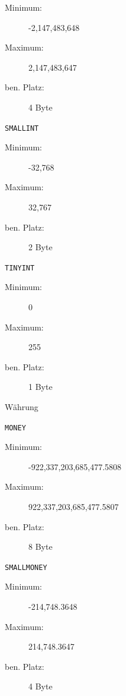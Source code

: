 \documentclass[12pt,ngerman,a4paper,index=totoc,twoside]{scrartcl}
\newcommand{\sql}[1]{\texttt{#1}}
\begin{document}
\begin{compactitem}
\begin{compactitem}
   \begin{description}
  	\item[Minimum:] -2,147,483,648
  	\item[Maximum:] 2,147,483,647
  	\item[ben. Platz:] 4 Byte
  \end{description}	

  
 \item \sql{SMALLINT}  
 
   \begin{description}
  	\item[Minimum:] -32,768
  	\item[Maximum:] 32,767
  	\item[ben. Platz:] 2 Byte 
  \end{description}	

 
 \item \sql{TINYINT}  
   \begin{description}
  	\item[Minimum:] 0 
  	\item[Maximum:] 255
  	\item[ben. Platz:] 1 Byte
  \end{description}	
  
 \end{compactitem}

\item Währung
\begin{compactitem}
 \item \sql{MONEY}  

  \begin{description}
  	\item[Minimum:] -922,337,203,685,477.5808
  	\item[Maximum:] 922,337,203,685,477.5807
  	\item[ben. Platz:] 8 Byte
  \end{description}	

 \item \sql{SMALLMONEY}  

  \begin{description}
  	\item[Minimum:] -214,748.3648  
  	\item[Maximum:] 214,748.3647
  	\item[ben. Platz:] 4 Byte 
  \end{description}	



\end{compactitem}
\end{compactitem}
\end{document}
